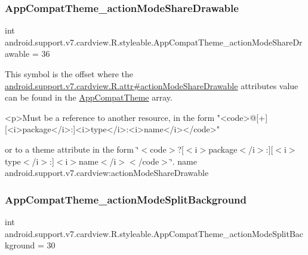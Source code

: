 \subsubsection{\texorpdfstring{App\+Compat\+Theme\+\_\+action\+Mode\+Share\+Drawable}{AppCompatTheme\_actionModeShareDrawable}}
{\footnotesize\ttfamily int android.\+support.\+v7.\+cardview.\+R.\+styleable.\+App\+Compat\+Theme\+\_\+action\+Mode\+Share\+Drawable = 36\hspace{0.3cm}{\ttfamily [static]}}

This symbol is the offset where the \hyperlink{classandroid_1_1support_1_1v7_1_1cardview_1_1R_1_1attr_aa3b0c2c648267047d5c788a1203d3e2f}{android.\+support.\+v7.\+cardview.\+R.\+attr\#action\+Mode\+Share\+Drawable} attribute\textquotesingle{}s value can be found in the \hyperlink{classandroid_1_1support_1_1v7_1_1cardview_1_1R_1_1styleable_a52e6f69f954ecc2622d72c0b4d298938}{App\+Compat\+Theme} array.

\begin{DoxyVerb}      <p>Must be a reference to another resource, in the form "<code>@[+][<i>package</i>:]<i>type</i>:<i>name</i></code>"
\end{DoxyVerb}
 or to a theme attribute in the form \char`\"{}$<$code$>$?\mbox{[}$<$i$>$package$<$/i$>$\+:\mbox{]}\mbox{[}$<$i$>$type$<$/i$>$\+:\mbox{]}$<$i$>$name$<$/i$>$$<$/code$>$\char`\"{}.  name android.\+support.\+v7.\+cardview\+:action\+Mode\+Share\+Drawable \mbox{\label{classandroid_1_1support_1_1v7_1_1cardview_1_1R_1_1styleable_a99300a8012a768bb28bea139da6de52e}} 
\subsubsection{\texorpdfstring{App\+Compat\+Theme\+\_\+action\+Mode\+Split\+Background}{AppCompatTheme\_actionModeSplitBackground}}
{\footnotesize\ttfamily int android.\+support.\+v7.\+cardview.\+R.\+styleable.\+App\+Compat\+Theme\+\_\+action\+Mode\+Split\+Background = 30\hspace{0.3cm}{\ttfamily [static]}}

